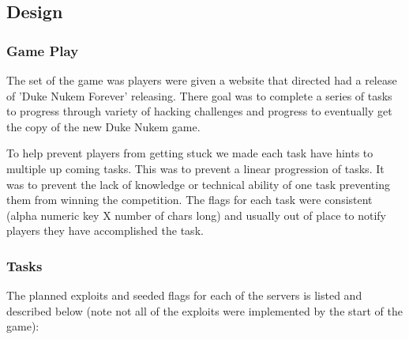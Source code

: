 \documentclass[10pt]{article}
\begin{document}

\subsection{Design}

\subsubsection{Game Play}
The set of the game was players were given a website that directed had a release of
'Duke Nukem Forever' releasing. There goal was to complete a series of tasks
to progress through variety of hacking challenges and progress to eventually get
the copy of the new Duke Nukem game.

To help prevent players from getting stuck we made each task have hints to multiple
up coming tasks. This was to prevent a linear progression of tasks. It was to prevent
the lack of knowledge or technical ability of one task preventing them from winning
the competition. The flags for each task were consistent (alpha numeric key X number
of chars long) and usually out of place to notify players they have accomplished
the task.

\subsubsection{Tasks}
The planned exploits and seeded flags for each of the servers is listed and
described below (note not all of the exploits were implemented by the start of
the game):
\end{document}

